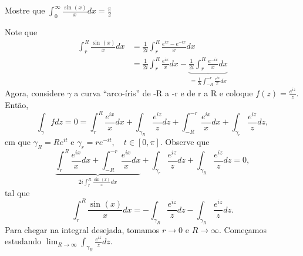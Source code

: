 \documentclass[complex.tex]{subfiles}
\begin{document}
\begin{exer*}
	Mostre que \(\int_{0}^{\infty}\frac{\sin^{}{(x)}}{x}dx = \frac{\pi }{2}\)

	Note que
	\begin{align*}
		\int_{r}^{R}\frac{\sin^{}{(x)}}{x}dx & = \frac{1}{2i}\int_{r}^{R}\frac{e^{ix}-e^{-ix}}{x}dx                                                                                                     \\
		                                     & = \frac{1}{2i}\int_{r}^{R}\frac{e^{ix}}{x}dx - \underbrace{\frac{1}{2i}\int_{r}^{R}\frac{e^{-ix}}{x}dx}_{= \frac{1}{2i}\int_{-R}^{-r}\frac{e^{ix}}{x}dx}
	\end{align*}
	Agora, considere \(\gamma \) a curva ``arco-íris'' de -R a -r e de r a R e coloque \(f(z) = \frac{e^{iz}}{z}.\) Então,
	\[
		\int_{\gamma }^{}f dz = 0 = \int_{r}^{R}\frac{e^{ix}}{x}dx + \int_{\gamma_{R}}^{}\frac{e^{iz}}{z}dz + \int_{-R}^{-r}\frac{e^{ix}}{x}dx + \int_{\gamma_{r}}^{}\frac{e^{iz}}{z}dz,
	\]
	em que \(\gamma_{R} = Re^{it}\) e \(\gamma_{r} = r e^{-it},\quad t\in [0,\pi ].\) Observe que
	\[
		\underbrace{\int_{r}^{R}\frac{e^{ix}}{x}dx + \int_{-R}^{-r}\frac{e^{ix}}{x}dx}_{2i \int_{r}^{R}\frac{\sin^{}{(x)}}{x}dx} + \int_{\gamma_{r}}^{}\frac{e^{iz}}{z}dz + \int_{\gamma_{R}}^{}\frac{e^{iz}}{z}dz = 0,
	\]
	tal que
	\[
		\int_{r}^{R}\frac{\sin^{}{(x)}}{x}dx = - \int_{\gamma_{R}}^{}\frac{e^{iz}}{z}dz - \int_{\gamma_{R}}^{}\frac{e^{iz}}{z}dz.
	\]
	Para chegar na integral desejada, tomamos \(r\to 0 \) e \(R\to \infty.\) Começamos estudando \(\lim_{R\to \infty}\int_{\gamma_{R}}^{}\frac{e^{iz}}{z}dz\).


\end{exer*}
\end{document}
